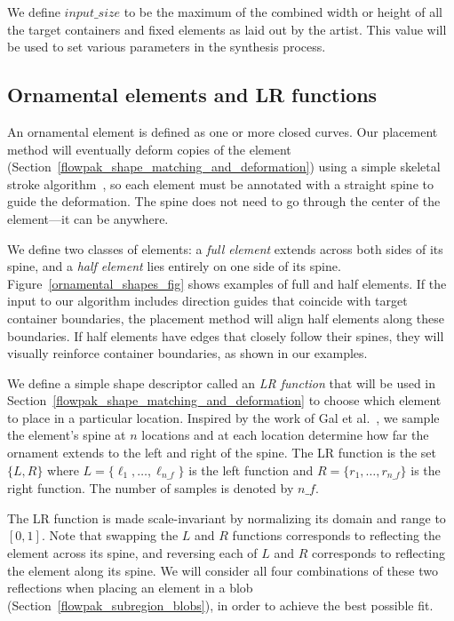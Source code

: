 We define $input\_size$ to be the maximum of the combined width or height
of all the target containers and fixed elements as laid out by the artist.
This value will
be used to set various parameters in the synthesis process.

\subsection{Ornamental elements and LR functions}
\label{flowpak_ornamental_element_and_lr_functions}

An ornamental element is defined as one or more closed curves.  Our placement method will
eventually deform copies of the element (Section~\ref{flowpak_shape_matching_and_deformation}) 
using a simple skeletal stroke algorithm~\cite{Hsu93},
so each element must be annotated with a straight spine to guide the deformation.  The spine
does not need to go through the center of the element---it can be anywhere.

We define two classes of elements: a \textit{full element} extends across
both sides of its
spine, and a \textit{half element} lies entirely on one side of its spine.
Figure~\ref{ornamental_shapes_fig} shows examples of full and half elements.  If the input
to our algorithm includes direction guides that coincide with target container boundaries,
the placement method will align half elements along these boundaries.  
If half elements 
have edges that closely follow their spines, they will visually reinforce
container boundaries, as shown in our examples.

We define a simple shape descriptor called an \textit{LR function}
that will be used in
Section~\ref{flowpak_shape_matching_and_deformation} to choose which element to place in a particular location. 
Inspired by the work of Gal et al.~\cite{Gal2007A}, we sample the element's
spine at $n$ locations and at each location determine how far the ornament extends to the
left and right of the spine. The LR function is the set $\{L, R\}$ where $L=\{\ell_1,\ldots,\ell_{n\text{\_}f}\}$
is the left function and $R=\{r_1,\ldots,r_{n\text{\_}f}\}$ is the right function. The number of samples is denoted by $n\text{\_}f$.

The LR function is made scale-invariant by normalizing its
domain and range to $[0,1]$.  Note that swapping the $L$ and $R$ functions
corresponds to reflecting the element across its spine, and reversing each
of $L$ and $R$ corresponds to reflecting the element along its spine.  We
will consider all four combinations of these two reflections when placing 
an element in a blob (Section~\ref{flowpak_subregion_blobs}),
in order to achieve the best possible fit.

